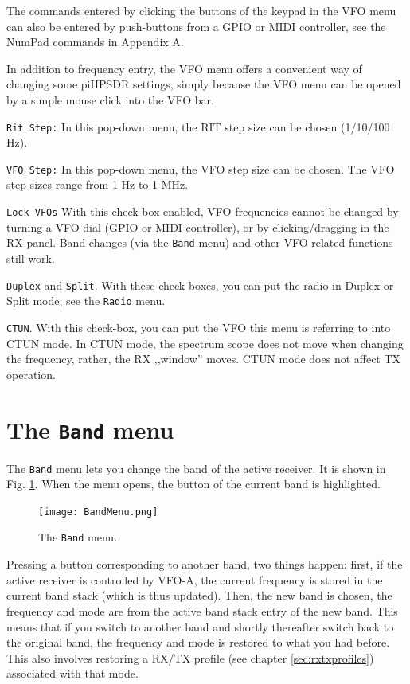 \documentclass[12pt]{book}
\def\rett#1{\texttt{\color{red}#1}}
\def\bltt#1{\texttt{\color{blue}#1}}
\def\pH{pi\-HPSDR\xspace}
\begin{document}
The commands entered by clicking the buttons of the keypad in the VFO menu
can also be entered by push-buttons from a GPIO or MIDI controller, see
the NumPad commands in Appendix A.

In addition to frequency entry, the VFO menu offers a convenient way of changing
some \pH settings, simply because the VFO menu can be opened by a simple
mouse click into the VFO bar.

\rett{Rit Step:} In this pop-down menu, the RIT step size can be chosen (1/10/100 Hz).

\rett{VFO Step:} In this pop-down menu, the VFO step size can be chosen. The VFO step
sizes range from 1 Hz to 1 MHz.

\rett{Lock VFOs} With this check box enabled, VFO frequencies cannot be changed by
turning a VFO dial (GPIO or MIDI controller), or by clicking/dragging in the RX panel.
Band changes (via the \bltt{Band} menu) and other VFO related functions still work.

\rett{Duplex} and \rett{Split}. With these check boxes, you can put the radio
in Duplex or Split mode, see the \bltt{Radio} menu.

\rett{CTUN}. With this check-box, you can put the VFO this menu is referring to into
CTUN mode. In CTUN mode, the spectrum scope does not move when changing the frequency,
rather, the RX ,,window'' moves. CTUN mode does not affect TX operation.

\section{The \texttt{Band} menu}
\label{sec:bandmenu}
The \bltt{Band} menu lets you change the band of the active receiver. It is shown
in Fig. \ref{fig:BandMenu}. When the menu opens, the button of the current band
is highlighted.

\begin{figure}[ht]
\center
\texttt{[image: BandMenu.png]}
\caption{The \bltt{Band} menu.}
\label{fig:BandMenu}
\end{figure}

Pressing a button corresponding to another band, two things happen: first, if the
active receiver is controlled by VFO-A, the current frequency is stored in the current
band stack (which is thus updated). Then, the new band is chosen, the frequency and mode
are from the active band stack entry of the new band. This means that if you switch
to another band and shortly thereafter switch back to the original band, the
frequency and mode is restored to what you had before. This also involves restoring
a RX/TX profile (see chapter \ref{sec:rxtxprofiles}) associated with that mode.
\end{document}

